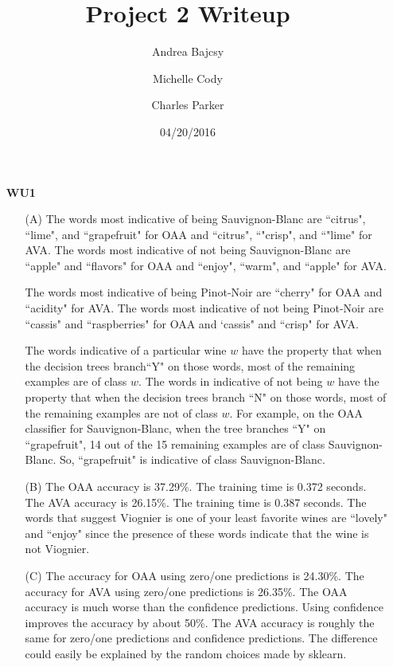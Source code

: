\documentclass{article}
\title{Project 2 Writeup}
\date{04/20/2016}
\author{Andrea Bajcsy \and Michelle Cody \and Charles Parker }
\begin{document}
	\maketitle
	
	\begin{enumerate}
	
	\item[\textbf{WU1}]
	
	\begin{enumerate}
		\item[(A)] 	 The words most indicative of being Sauvignon-Blanc are ``citrus", ``lime", and ``grapefruit" for OAA and ``citrus", ``"crisp", and ``"lime" for AVA. The words most indicative of not being Sauvignon-Blanc are ``apple" and ``flavors" for OAA and ``enjoy", ``warm", and ``apple" for AVA.
		
		The words most indicative of being Pinot-Noir are ``cherry" for OAA and ``acidity" for AVA. The words most indicative of not being Pinot-Noir are ``cassis" and ``raspberries" for OAA and `cassis" and ``crisp" for AVA.
		
		The words indicative of a particular wine $w$ have the property that when the decision trees branch``Y" on those words, most of the remaining examples are of class $w$. The words in indicative of not being $w$ have the property that when the decision trees branch ``N" on those words, most of the remaining examples are not of class $w$. For example, on the OAA classifier for Sauvignon-Blanc, when the tree branches ``Y" on ``grapefruit", 14 out of the 15 remaining examples are of class Sauvignon-Blanc. So, ``grapefruit" is indicative of class Sauvignon-Blanc.
		
		\item[(B)] The OAA accuracy is 37.29\%. The training time is 0.372 seconds.  The AVA accuracy is 26.15\%.  The training time is 0.387 seconds. The words that suggest Viognier is one of your least favorite wines are ``lovely" and ``enjoy" since the presence of these words indicate that the wine is not Viognier.
		
		\item[(C)] The accuracy for OAA using zero/one predictions is 24.30\%. The accuracy for AVA using zero/one predictions is 26.35\%. The OAA accuracy is much worse than the confidence predictions. Using confidence improves the accuracy by about 50\%. The AVA accuracy is roughly the same for zero/one predictions and confidence predictions. The difference could easily be explained by the random choices made by sklearn.
	\end{enumerate}
	


\end{enumerate}
\end{document}
